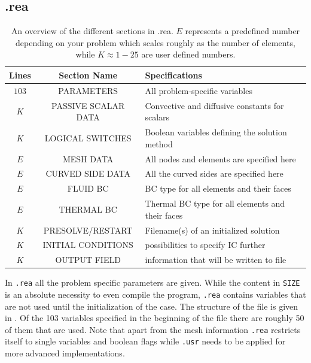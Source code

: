 \subsection{.rea}
%
\begin{table}[h]
    \centering
    \begin{tabular}{c c l}
       Lines & Section Name & Specifications \\ \hline
       $103$ & PARAMETERS & All problem-specific variables \\ 
       $K$ & PASSIVE SCALAR DATA & Convective and diffusive constants for scalars\\ 
       $K$ & LOGICAL SWITCHES & Boolean variables defining the solution method \\ 
       $E$ & MESH DATA & All nodes and elements are specified here\\
       $E$ & CURVED SIDE DATA & All the curved sides are specified here\\
       $E$ & FLUID BC& BC type for all elements and their faces\\
       $E$ & THERMAL BC& Thermal BC type for all elements and their faces\\
       $K$ & PRESOLVE/RESTART & Filename(s) of an initialized solution \\
       $K$ & INITIAL CONDITIONS & possibilities to specify IC further \\
       $K$ & OUTPUT FIELD & information that will be written to file\\
    \end{tabular}
    \caption{An overview of the different sections in .rea. $E$ represents a predefined number depending on your problem
    which scales roughly as the number of elements, while $K\approx 1-25$ are user defined numbers.}
    \label{tab:reafile}
\end{table}
%
In \verb|.rea| all the problem specific parameters are given. While the content in \verb|SIZE| 
is an absolute necessity to even compile the program, \verb|.rea| contains variables 
that are not used until the initialization of the case. The structure of the file is given in .
Of the 103 variables specified in the beginning of the file there are roughly 50 of them that are used. 
Note that apart from the mesh information \verb|.rea| restricts itself to single variables and boolean flags 
while \verb|.usr| needs to be applied for more advanced implementations. 
